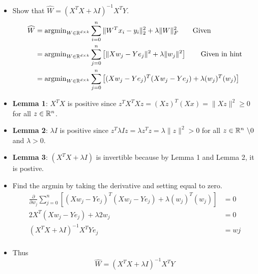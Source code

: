 \begin{itemize}
    \item[] Show that $\widehat{W} = \left( X^T X + \lambda I \right)^{-1} X^T Y$.
	\begin{align*}
	    \widehat{W} 
		&= \text{argmin}_{W \in \mathbb{R}^{d \times k}} \sum_{i=0}^{n} \| W^Tx_{i} - y_{i} \|^{2}_{2} + \lambda \|W\|_{F}^{2} \tag*{Given} \\
		&= \text{argmin}_{W \in \mathbb{R}^{d \times k}} \sum_{j=0}^{n} \left[ \| Xw_j - Ye_j \|^{2} + \lambda \| w_j \|^{2} \right] \tag*{Given in hint} \\
		&= \text{argmin}_{W \in \mathbb{R}^{d \times k}} \sum_{j=0}^{n} \left[ ( Xw_j - Ye_j )^T (Xw_j - Ye_j) + \lambda (w_j)^T (w_j) \right] \\
	\end{align*}
    \item[] {\bf Lemma 1}: $X^T X$ is positive since $z^T X^T X z = (X z)^T (X x) = \| Xz \|^2 \geq 0$ for all $z \in \mathbb{R}^{n}$.
    \item[] {\bf Lemma 2}: $\lambda I$ is positive since $z^T \lambda I z = \lambda z^T z = \lambda \| z \|^2 > 0$ for all $z \in \mathbb{R}^{n} \ \backslash 0$ and $\lambda > 0$. 
    \item[] {\bf Lemma 3}: $(X^T X + \lambda I)$ is invertible because by Lemma 1 and Lemma 2, it is postive.
    \item[] Find the argmin by taking the derivative and setting equal to zero.
	\begin{align*}
	    \frac{\partial}{\partial w_j} \sum_{j=0}^{n} \left[ ( Xw_j - Ye_j )^T (Xw_j - Ye_j) + \lambda (w_j)^T (w_j) \right] &= 0 \\
	    2X^T (Xw_j - Ye_j) + \lambda 2w_j &= 0 \\
	    (X^T X + \lambda I)^{-1} X^T Ye_j &= wj \\
	\end{align*}
    \item[] Thus $$\boxed{ \widehat{W} = (X^T X + \lambda I)^{-1} X^T Y }$$
\end{itemize}
